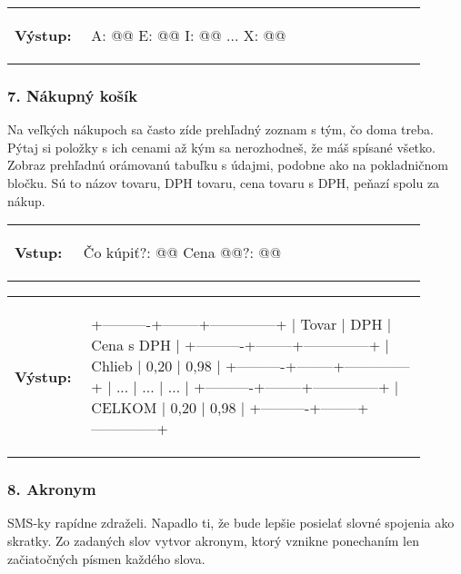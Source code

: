 \vspace{-2em}
\begin{tabular}{@{}p{0.15\linewidth}p{0.75\linewidth}}
\textbf{\small Výstup:} &
\vspace{-3em}
\begin{code}
A: @\fbox{****}@
E: @\fbox{*******}@
I: @\fbox{****}@
...
X: @\fbox{*}@
\end{code}
\end{tabular}
\vspace{-2em}


\subsubsection*{7. Nákupný košík}
Na veľkých nákupoch sa často zíde prehľadný zoznam s tým, čo doma treba. Pýtaj si položky s ich cenami až kým sa nerozhodneš, že máš spísané všetko. Zobraz prehľadnú orámovanú tabuľku s údajmi, podobne ako na pokladničnom bločku. Sú to názov tovaru, DPH tovaru, cena tovaru s DPH, peňazí spolu za nákup.

\begin{tabular}{@{}p{0.15\linewidth}p{0.75\linewidth}}
\textbf{\small Vstup:} &
\vspace{-3em}
\begin{code}
Čo kúpiť?: @\fbox{\phantom{vstup}}@
Cena @\fbox{\phantom{vstup}}@?: @\fbox{\phantom{vstup}}@
\end{code}
\end{tabular}

\vspace{-2em}
\begin{tabular}{@{}p{0.15\linewidth}p{0.75\linewidth}}
\textbf{\small Výstup:} &
\vspace{-3em}
\begin{code}
+----------+--------+--------------+
| Tovar    |  DPH   |  Cena s DPH  |
+----------+--------+--------------+
| Chlieb   |  0,20  |      0,98    |
+----------+--------+--------------+
|    ...   |  ...   |     ...      |
+----------+--------+--------------+
| CELKOM   |  0,20  |      0,98    |
+----------+--------+--------------+
\end{code}
\end{tabular}
\vspace{-2em}

\subsubsection*{8. Akronym}
SMS-ky rapídne zdraželi. Napadlo ti, že bude lepšie posielať slovné spojenia ako skratky. Zo zadaných slov vytvor akronym, ktorý vznikne ponechaním len začiatočných písmen každého slova.

